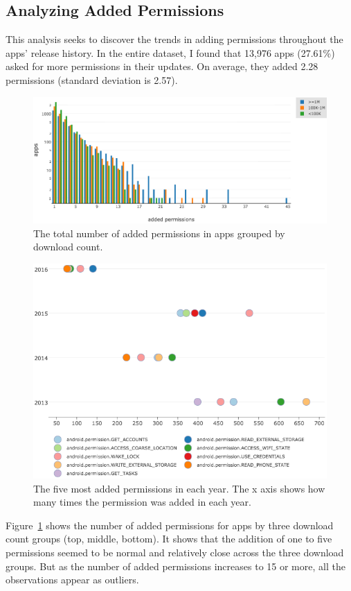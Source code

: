 \subsection{Analyzing Added Permissions}
This analysis seeks to discover the trends in adding permissions throughout the apps' release history.
In the entire dataset, I found that 13,976 apps (27.61\%) asked for more permissions in their updates.
On average, they added 2.28 permissions (standard deviation is 2.57).
\begin{figure}[h]
	\includegraphics[scale=0.50]{figures/findings/added_permissions_downloads.png}
	\caption{The total number of added permissions in apps grouped by download count.}
	\label{fig:added_permissions_downloads}
\end{figure}
\begin{figure}[h]
	\includegraphics[scale=0.60]{figures/findings/added_permissions_over_time.png}
	\caption{The five most added permissions in each year. The x axis shows how many times the permission was added in each year.}
	\label{fig:added_permissions_over_time}
\end{figure}
Figure~\ref{fig:added_permissions_downloads} shows the number of added permissions for apps by three download count groups (top, middle, bottom).
It shows that the addition of one to five permissions seemed to be normal and relatively close across the three download groups.
But as the number of added permissions increases to 15 or more, all the observations appear as outliers.


